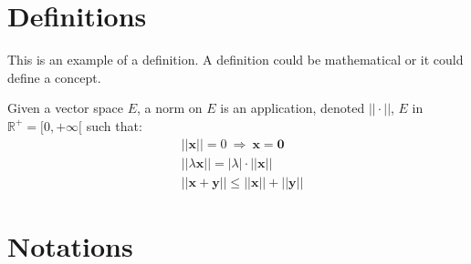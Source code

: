 \documentclass[11pt,fleqn]{book} %
\begin{document}
%
%
%
%


\section{Definitions}

This is an example of a definition. A definition could be mathematical or it could define a concept.

\begin{definition}
Given a vector space $E$, a norm on $E$ is an application, denoted $||\cdot||$, $E$ in $\mathbb{R}^+=[0,+\infty[$ such that:
\begin{align}
& ||\mathbf{x}||=0\ \Rightarrow\ \mathbf{x}=\mathbf{0}\\
& ||\lambda \mathbf{x}||=|\lambda|\cdot ||\mathbf{x}||\\
& ||\mathbf{x}+\mathbf{y}||\leq ||\mathbf{x}||+||\mathbf{y}||
\end{align}
\end{definition}


\section{Notations}
\end{document}
